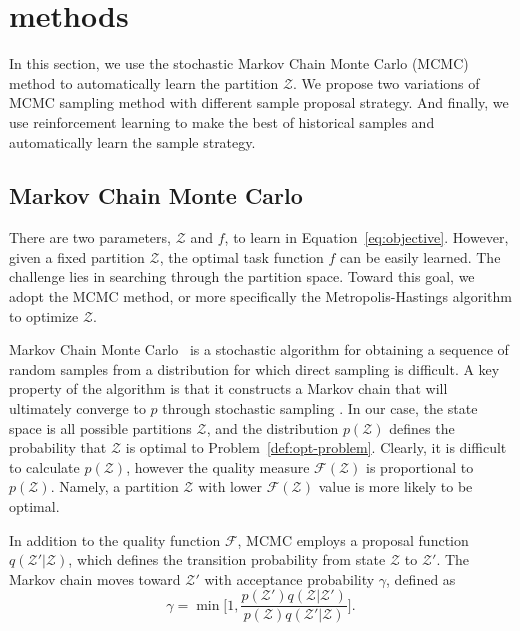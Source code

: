 \section{methods}
\label{ch4-sec:method}

In this section, we use the stochastic Markov Chain Monte Carlo (MCMC) method to automatically learn the partition $\mathcal{Z}$. We propose two variations of MCMC sampling method with different sample proposal strategy. And finally, we use reinforcement learning to make the best of historical samples and automatically learn the sample strategy.


\subsection{Markov Chain Monte Carlo}

There are two parameters, $\mathcal{Z}$ and $f$, to learn in Equation~\ref{eq:objective}. However, given a fixed partition $\mathcal{Z}$, the optimal task function $f$ can be easily learned. The challenge lies in searching through the partition space. Toward this goal, we adopt the MCMC method, or more specifically the Metropolis-Hastings algorithm to optimize $\mathcal{Z}$. 

Markov Chain Monte Carlo~\cite{andrieu2003introduction} is a stochastic algorithm for obtaining a sequence of random samples from a distribution for which direct sampling is difficult. A key property of the algorithm is that it constructs a Markov chain that will ultimately converge to $p$ through stochastic sampling \cite{ml:murphy}. In our case, the state space is all possible partitions $\mathcal{Z}$, and the distribution $p(\mathcal{Z})$ defines the probability that $\mathcal{Z}$ is optimal to Problem~\ref{def:opt-problem}. Clearly, it is difficult to calculate $p(\mathcal{Z})$, however the quality measure $\mathcal{F}(\mathcal{Z})$ is proportional to $p(\mathcal{Z})$. Namely, a partition $\mathcal{Z}$ with lower $\mathcal{F}(\mathcal{Z})$ value is more likely to be optimal.


In addition to the quality function $\mathcal{F}$, MCMC employs a proposal function $q(\mathcal{Z}'|\mathcal{Z})$, which defines the transition probability from state $\mathcal{Z}$ to $\mathcal{Z}'$. The Markov chain moves toward $\mathcal{Z}'$ with acceptance probability $\gamma$, defined as
\begin{equation}
\gamma = \min \Big [ 1, \frac{p(\mathcal{Z}')q(\mathcal{Z}| \mathcal{Z}')}{p(\mathcal{Z})q(\mathcal{Z}'|\mathcal{Z})} \Big ].
\label{eq:gamma}
\end{equation}

